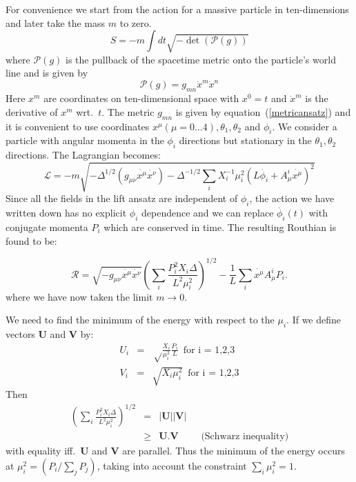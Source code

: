 \documentclass[a4paper,12pt]{article}
\begin{document}
For convenience we start from the action for a massive particle in
ten-dimensions and later take the mass $m$ to zero.
\begin{equation}
  \label{eq:particleprobe}
  S = -m \int dt \sqrt{-\det(\mathcal{P}(g))}  
\end{equation}
where $\mathcal{P}(g)$ is the pullback of the spacetime metric onto the particle's world line and is given by
\begin{equation}
  \label{eq:pullback}
  \mathcal{P}(g) = g_{m n} \dot{x}^m \dot{x}^n
\end{equation}
Here $x^{m}$ are coordinates on ten-dimensional space with $x^0 = t$ and
$\dot{x}^m$ is the derivative of $x^m$ wrt.\ $t$. The metric $g_{m n}$ is given by equation~(\ref{metricansatz}) and it is convenient to use coordinates $x^{\mu} (\mu = 0 \ldots 4), \theta_1, \theta_2$ and $ \phi_i$. We consider a particle with angular momenta in the $ \phi_i$ directions but stationary in the $\theta_1, \theta_2$ directions. The Lagrangian becomes:
\begin{equation}
  \label{eq:particleprobe2}
  \mathcal{L} = -m  \sqrt{- \Delta^{1/2}(g_{\mu \nu}\dot{x^{\mu}}\dot{ x^{\nu}}) - \Delta^{-1/2} \sum_i X_i^{-1} \mu_i^2 (L \dot{\phi_i} +  A^i_{\mu} \dot{x^{\mu}})^2}
\end{equation}
Since all the fields in the lift ansatz are independent of $\phi_i$, the action we have written down has no explicit $\phi_i$ dependence and we can replace $\dot{\phi_i}(t)$ with conjugate momenta $P_i$ which are conserved in time. The resulting Routhian is found to be:

\begin{equation}
\mathcal{R} = \sqrt{-g_{\mu \nu}\dot{x^{\mu}}\dot{ x^{\nu}}} \left( \sum_i \frac{P_i^2 X_i \Delta}{L^2\mu_i^2}\right)^{1/2} - \frac{1}{L} \sum_i \dot{x^{\mu}} A^i_{\mu} P_i.
\end{equation}
where we have now taken the limit $m \rightarrow 0$.

We need to find the minimum of the energy with respect to the $\mu_i$. 
If we define vectors $\mathbf{U}$ and $\mathbf{V}$ by:
\begin{eqnarray*}
  U_i &=& \sqrt\frac{X_i}{\mu_i^2} \frac{P_i}{L} \, \mbox{  for i = 1,2,3} \\
V_i &=&  \sqrt{X_i \mu_i^2}  \, \mbox{  for i = 1,2,3} 
\end{eqnarray*}
Then 
\begin{eqnarray*}
  \left( \sum_i \frac{P_i^2 X_i \Delta}{L^2\mu_i^2}\right)^{1/2} &=& |\mathbf{U}| |\mathbf{V}|  \\
&\geq&  \mathbf{U}.\mathbf{V}  \qquad  \mbox{  (Schwarz inequality)}
\end{eqnarray*}
with equality iff.\ $\mathbf{U}$ and $\mathbf{V}$ are parallel. Thus the minimum of the energy occurs at $\mu_i^2 = (P_i / \sum_j P_j)$, taking into account the constraint $\sum_i \mu_i^2 = 1$.
\end{document}
